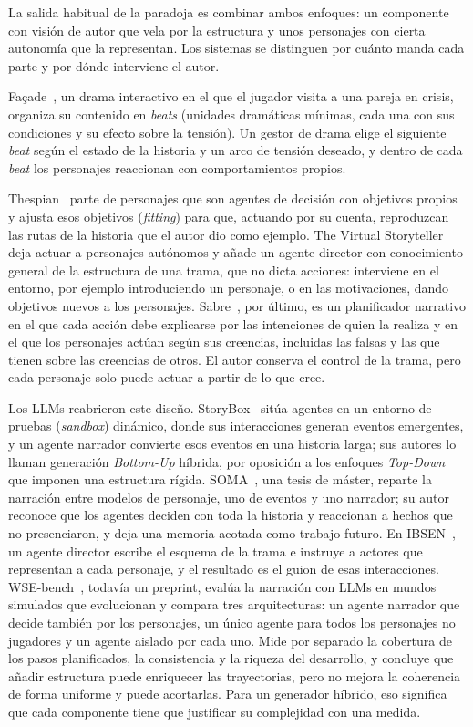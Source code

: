 La salida habitual de la paradoja es combinar ambos enfoques: un componente con visión de autor que
vela por la estructura y unos personajes con cierta autonomía que la representan. Los sistemas se
distinguen por cuánto manda cada parte y por dónde interviene el autor.

Façade~\cite{mateas2005}, un drama interactivo en el que el jugador visita a una pareja en crisis,
organiza su contenido en \textit{beats} (unidades dramáticas mínimas, cada una con sus condiciones y
su efecto sobre la tensión). Un gestor de drama elige el siguiente \textit{beat} según el estado de
la historia y un arco de tensión deseado, y dentro de cada \textit{beat} los personajes reaccionan con
comportamientos propios.

Thespian~\cite{si2005} parte de personajes que son agentes de decisión con
objetivos propios y ajusta esos objetivos (\textit{fitting}) para que, actuando por su cuenta,
reproduzcan las rutas de la historia que el autor dio como ejemplo. The Virtual
Storyteller~\cite{theune2003} deja actuar a personajes autónomos y añade un agente director con
conocimiento general de la estructura de una trama, que no dicta acciones: interviene en el entorno,
por ejemplo introduciendo un personaje, o en las motivaciones, dando objetivos nuevos a los
personajes. Sabre~\cite{ware2021}, por último, es un planificador narrativo en el que cada acción
debe explicarse por las intenciones de quien la realiza y en el que los personajes actúan según sus
creencias, incluidas las falsas y las que tienen sobre las creencias de otros. El autor conserva el
control de la trama, pero cada personaje solo puede actuar a partir de lo que cree.

Los LLMs reabrieron este diseño. StoryBox~\cite{chen2026a} sitúa agentes en un entorno de pruebas
(\textit{sandbox}) dinámico, donde sus interacciones generan eventos emergentes, y un agente narrador
convierte esos eventos en una historia larga; sus autores lo llaman generación \textit{Bottom-Up}
híbrida, por oposición a los enfoques \textit{Top-Down} que imponen una estructura rígida.
SOMA~\cite{chung2025}, una tesis de máster, reparte la narración entre modelos de personaje, uno de
eventos y uno narrador; su autor reconoce que los agentes deciden con toda la historia y reaccionan a
hechos que no presenciaron, y deja una memoria acotada como trabajo futuro. En IBSEN~\cite{han2024},
un agente director escribe el esquema de la trama e instruye a actores que representan a cada
personaje, y el resultado es el guion de esas interacciones.
WSE-bench~\cite{chen2026b}, todavía un preprint, evalúa la narración con LLMs en mundos simulados que
evolucionan y compara tres arquitecturas: un agente narrador que decide también por los personajes,
un único agente para todos los personajes no jugadores y un agente aislado por cada uno. Mide por
separado la cobertura de los pasos planificados, la consistencia y la riqueza del desarrollo, y
concluye que añadir estructura puede enriquecer las trayectorias, pero no mejora la coherencia de
forma uniforme y puede acortarlas. Para un generador híbrido, eso significa que cada componente
tiene que justificar su complejidad con una medida.

